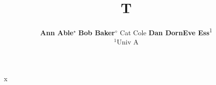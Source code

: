 \documentclass{article}
\begin{document}
\title{T}
\author{\textbf{Ann Able}$^{\star}$ \quad \textbf{Bob Baker}$^{\diamond}$ \quad Cat Cole \quad
\textbf{Dan Dorn}\quad\quad \textbf{Eve Ess}\textsuperscript{\rm 1}\\
$^1$Univ A}
\maketitle
x
\end{document}
